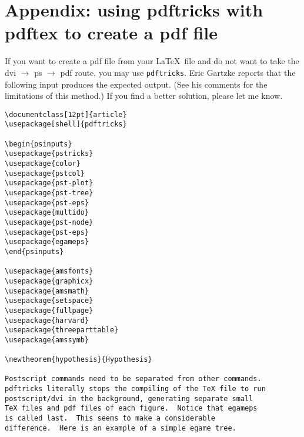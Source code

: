 \documentclass[12pt]{article}
\begin{document}
\section{Appendix: using pdftricks with pdftex to create a pdf
file}\label{s:pdftricks}
If you want to create a pdf file from your \LaTeX\ file and do not want to
take the dvi $\rightarrow$ ps $\rightarrow$ pdf route, you may use
\verb+pdftricks+.  Eric Gartzke reports that the following input produces the
expected output.  (See his comments for the limitations of this method.)  If
you find a better solution, please let me know.

\begin{verbatim}\documentclass[12pt]{article}
\usepackage[shell]{pdftricks}

\begin{psinputs}
\usepackage{pstricks}
\usepackage{color}
\usepackage{pstcol}
\usepackage{pst-plot}
\usepackage{pst-tree}
\usepackage{pst-eps}
\usepackage{multido}
\usepackage{pst-node}
\usepackage{pst-eps}
\usepackage{egameps}
\end{psinputs}

\usepackage{amsfonts}
\usepackage{graphicx}
\usepackage{amsmath}
\usepackage{setspace}
\usepackage{fullpage}
\usepackage{harvard}
\usepackage{threeparttable}
\usepackage{amssymb}

\newtheorem{hypothesis}{Hypothesis}

Postscript commands need to be separated from other commands.
pdftricks literally stops the compiling of the TeX file to run
postscript/dvi in the background, generating separate small
TeX files and pdf files of each figure.  Notice that egameps 
is called last.  This seems to make a considerable
difference.  Here is an example of a simple egame tree.


\end{verbatim}
\end{document}
